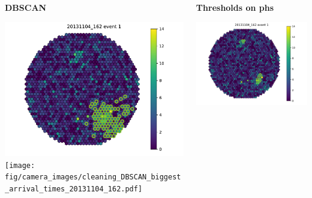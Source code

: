\begin{withoutheadline}
  \begin{frame}{}
    \begin{columns}[onlytextwidth]
      \begin{column}{0.33\textwidth}
        \centering
        \textbf{DBSCAN}\par\medskip
        \includegraphics[width=\textwidth, page=5]{fig/camera_images/cleaning_DBSCAN_biggest_pe_20131104_162.pdf}
        \texttt{[image: fig/camera\_images/cleaning\_DBSCAN\_biggest\_arrival\_times\_20131104\_162.pdf]}
      \end{column}
    \hfill%
      \begin{column}{0.33\textwidth}
        \centering
        \textbf{Thresholds on phs}\par\medskip
        \includegraphics[width=\textwidth, page=5]{fig/camera_images/cleaning_thresh_pe_20131104_162.pdf}

\end{column}
\end{columns}
\end{frame}
\end{withoutheadline}
